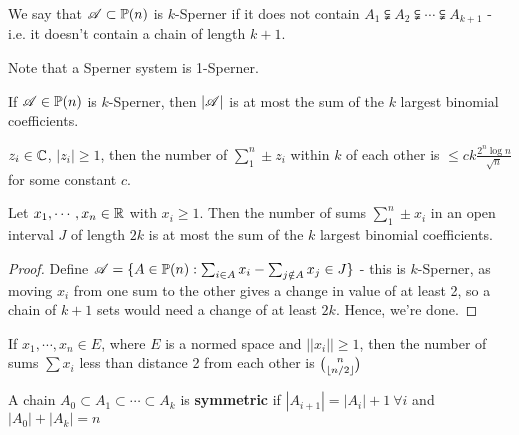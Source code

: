 \documentclass[a4paper]{article}
\begin{document}
\begin{defi}[$k$-Sperner]
	We say that $\mathscr{A}\subset\mathbb{P}(n)$ is $k$-Sperner if it does not contain $A_1\subsetneqq A_2\subsetneqq \cdots\subsetneqq A_{k+1}$ - i.e. it doesn't contain a chain of length $k+1$.
\end{defi}

Note that a Sperner system is 1-Sperner.

\begin{cor-num}[Erd\H{o}s, 1945]
	If $\mathscr{A}\in\mathbb{P}(n)$ is $k$-Sperner, then $|\mathscr{A}|$ is at most the sum of the $k$ largest binomial coefficients.
\end{cor-num}

\begin{thm}
	$z_i\in\mathbb{C}$, $\left|z_i\right|\geq 1$, then the number of $\sum_1^n\pm z_i$ within $k$ of each other is $\leq ck\frac{2^n\log n}{\sqrt{n}}$ for some constant $c$.
\end{thm}

\begin{thm-num}[Erd\H{o}s, 1945]
	Let $x_1,\cdots, x_n\in\mathbb{R}$ with $x_i\geq1$. Then the number of sums $\sum_1^n\pm x_i$ in an open interval $J$ of length $2k$ is at most the sum of the $k$ largest binomial coefficients.
\end{thm-num}
\begin{proof}
	Define $\mathscr{A}=\{A\in\mathbb{P}(n) : \sum_{i\in A}x_i - \sum_{j\notin A}x_j\in J\}$ - this is $k$-Sperner, as moving $x_i$ from one sum to the other gives a change in value of at least 2, so a chain of $k+1$ sets would need a change of at least $2k$. Hence, we're done.
\end{proof}

\begin{conj}[Erd\H{o}s, 1945]
	If $x_1,\cdots,x_n\in E$, where $E$ is a normed space and $\left|\left|x_i\right|\right|\geq1$, then the number of sums $\sum x_i$ less than distance 2 from each other is $\binom{n}{\left\lfloor n/2 \right\rfloor}$
\end{conj}

\begin{defi}
	A chain $A_0\subset A_1\subset \cdots \subset A_k$ is \textbf{symmetric} if $\left|A_{i+1}\right|=\left|A_{i}\right|+1\ \forall i$ and $\left|A_0\right|+\left|A_k\right|=n$
\end{defi}
\end{document}
